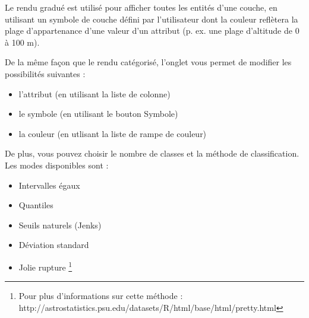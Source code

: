 
Le rendu gradué est utilisé pour afficher toutes les entités d'une couche, en 
utilisant un symbole de couche défini par l'utilisateur dont la couleur reflètera 
la plage d'appartenance d'une valeur d'un attribut (p. ex. une plage d'altitude 
de 0 à 100 m).

De la même façon que le rendu catégorisé, l'onglet  vous permet de 
modifier les possibilités suivantes :

\begin{itemize}[label=--]
\item l'attribut (en utilisant la liste de colonne)
\item le symbole (en utilisant le bouton Symbole)
\item la couleur (en utlisant la liste de rampe de couleur)
\end{itemize}

De plus, vous pouvez choisir le nombre de classes et la méthode de classification. Les modes disponibles sont :

\begin{itemize}
\item Intervalles égaux
\item Quantiles
\item Seuils naturels (Jenks)
\item Déviation standard
\item Jolie rupture \footnote{Pour plus d'informations sur cette méthode : http://astrostatistics.psu.edu/datasets/R/html/base/html/pretty.html}
\end{itemize}

